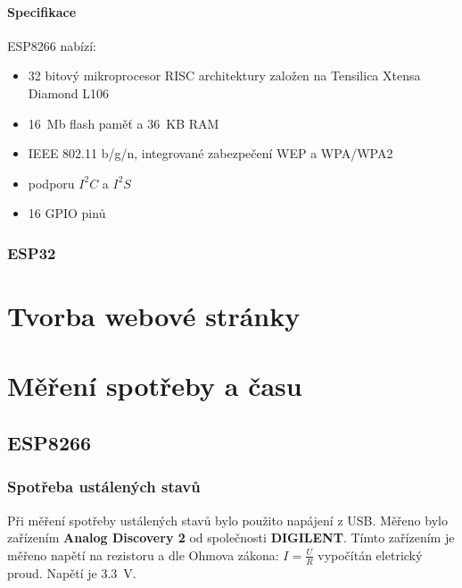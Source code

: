 \documentclass[a4paper, 12pt]{report}
\begin{document}
				\subsubsection{Specifikace}
					ESP8266 nabízí:
					\begin{itemize}
						\item 32 bitový mikroprocesor RISC architektury založen na Tensilica Xtensa Diamond L106
						\item \SI{16}{Mb} flash paměť a \SI{36}{KB} RAM
						\item IEEE 802.11 b/g/n, integrované zabezpečení WEP a WPA/WPA2
						\item podporu $I^2C$ a $I^2S$
						\item 16 GPIO pinů

					\end{itemize}
			\subsection{ESP32}
	\chapter{Tvorba webové stránky}
	\chapter{Měření spotřeby a času}
		\section{ESP8266}

			\subsection{Spotřeba ustálených stavů}
				Při měření spotřeby ustálených stavů bylo použito napájení z USB. Měřeno bylo zařízením \textbf{Analog Discovery 2} od společnosti \textbf{DIGILENT}. Tímto zařízením je měřeno napětí na rezistoru a dle Ohmova zákona: $I =\frac{U}{R}$ vypočítán eletrický proud. Napětí je \SI{3.3}{V}.
\end{document}
